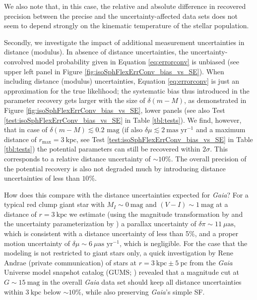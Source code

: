 \documentclass[iop,revtex4,numberedappendix,appendixfloats]{emulateapj}
\begin{document}
We also note that, in this case, the relative and absolute difference in recovered precision between the precise and the uncertainty-affected data sets does not seem to depend strongly on the kinematic temperature of the stellar population.


Secondly, we investigate the impact of additional measurement uncertainties in distance (modulus). In absence of distance uncertainties, the uncertainty-convolved model probability given in Equation \eqref{eq:errorconv} is unbiased (see upper left panel in Figure \ref{fig:isoSphFlexErrConv_bias_vs_SE}). When including distance (modulus) uncertainties, Equation \eqref{eq:errorconv} is just an approximation for the true likelihood; the systematic bias thus introduced in the parameter recovery gets larger with the size of $\delta (m-M)$, as demonstrated in Figure \ref{fig:isoSphFlexErrConv_bias_vs_SE}, lower panels (see also Test \ref{test:isoSphFlexErrConv_bias_vs_SE} in Table \ref{tbl:tests}). We find, however, that in case of $\delta(m-M) \lesssim 0.2 \text{ mag}$ (if also $\delta \mu \lesssim 2 ~\text{mas yr}^{-1}$ and a maximum distance of $r_\text{max} = 3~\text{kpc}$, see Test \ref{test:isoSphFlexErrConv_bias_vs_SE} in Table \ref{tbl:tests}) the potential parameters can still be recovered within $2 \sigma$. This corresponds to a relative distance uncertainty of $\sim10\%$. The overall precision of the potential recovery is also not degraded much by introducing distance uncertainties of less than $10\%$.

How does this compare with the distance uncertainties expected for \emph{Gaia}? For a typical red clump giant star with $M_I\sim0~\text{mag}$ and $(V-I)\sim1~\text{mag}$ at a distance of $r=3~\text{kpc}$ we estimate (using the magnitude transformation by \citet{2010A&A...523A..48J} and the uncertainty parameterization by \citet{2014EAS....67...23D}) a parallax uncertainty of $\delta\pi\sim11~\mu\text{as}$, which is consistent with a distance uncertainty of less than 5\%, and a proper motion uncertainty of $\delta \mu\sim6~\mu\text{as yr}^{-1}$, which is negligible. For the case that the modeling is not restricted to giant stars only, a quick investigation by Rene Andrae (private communication) of stars at $r=3~\text{kpc}\pm5~\text{pc}$ from the \emph{Gaia} Universe model snapshot catalog (GUMS; \citealt{2012A&A...543A.100R}) revealed that a magnitude cut at $G\sim15~\text{mag}$ in the overall \emph{Gaia} data set should keep all distance uncertainties within $3~\text{kpc}$ below $\sim10\%$, while also preserving \emph{Gaia}'s simple SF.
\end{document}

